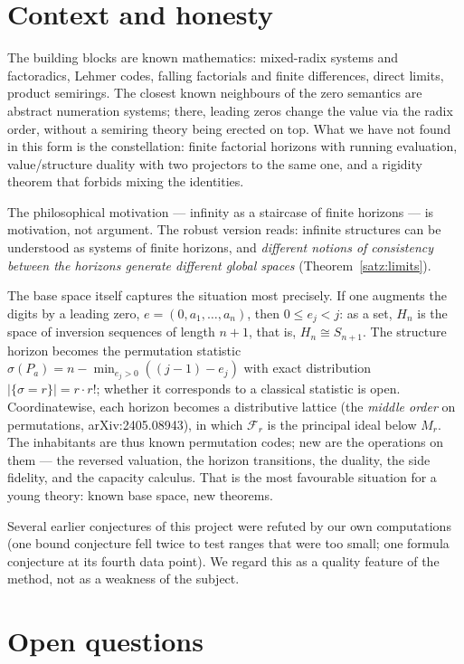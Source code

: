 \documentclass[11pt]{article}
\theoremstyle{definition}
\theoremstyle{remark}
\begin{document}
\section{Context and honesty}

The building blocks are known mathematics: mixed-radix systems and
factoradics, Lehmer codes, falling factorials and finite
differences, direct limits, product semirings. The closest known
neighbours of the zero semantics are abstract numeration systems;
there, leading zeros change the value via the radix order, without
a semiring theory being erected on top. What we have not found in
this form is the constellation: finite factorial horizons with
running evaluation, value/structure duality with two projectors to
the same one, and a rigidity theorem that forbids mixing the
identities.

The philosophical motivation --- infinity as a staircase of finite
horizons --- is motivation, not argument. The robust version reads:
infinite structures can be understood as systems of finite
horizons, and \emph{different notions of consistency between the
horizons generate different global spaces}
(Theorem~\ref{satz:limits}).

The base space itself captures the situation most precisely. If one
augments the digits by a leading zero, $e=(0,a_1,\dots,a_n)$, then
$0\le e_j<j$: as a set, $H_n$ is the space of inversion sequences
of length $n{+}1$, that is, $H_n\cong S_{n+1}$. The structure
horizon becomes the permutation statistic
$\sigma(P_a)=n-\min_{e_j>0}((j{-}1)-e_j)$ with exact distribution
$|\{\sigma=r\}|=r\cdot r!$; whether it corresponds to a classical
statistic is open. Coordinatewise, each horizon becomes a
distributive lattice (the \emph{middle order} on permutations,
arXiv:2405.08943), in which $\mathcal F_r$ is the principal ideal
below $M_r$. The inhabitants are thus known permutation codes; new
are the operations on them --- the reversed valuation, the horizon
transitions, the duality, the side fidelity, and the capacity
calculus. That is the most favourable situation for a young theory:
known base space, new theorems.

Several earlier conjectures of this project were refuted by our own
computations (one bound conjecture fell twice to test ranges that
were too small; one formula conjecture at its fourth data point).
We regard this as a quality feature of the method, not as a
weakness of the subject.

\section{Open questions}
\end{document}
